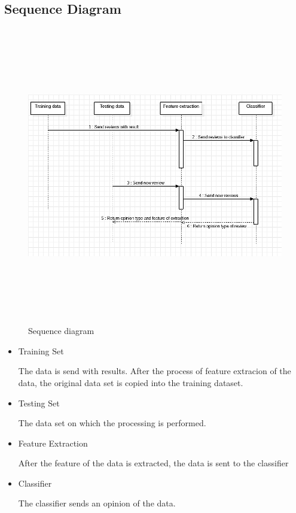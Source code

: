 \documentclass[oneside,a4paper,12pt]{book}
\begin{document}
\subsection{Sequence Diagram}
\begin{figure}[h!]
  \centering
  \includegraphics[width=15cm,
  height=13cm]{sequence.png}
  \caption{Sequence diagram}
\end{figure}
\begin{itemize}
    \item Training Set
    \par The data is send with results. After the process of feature extracion of the data, the original data set is copied into the training dataset.
    \item Testing Set
    \par The data set on which the processing is performed.
    \item Feature Extraction
    \par After the feature of the data is extracted, the data is sent to the classifier
    \item Classifier
    \par The classifier sends an opinion of the data.
\end{itemize}
\end{document}
